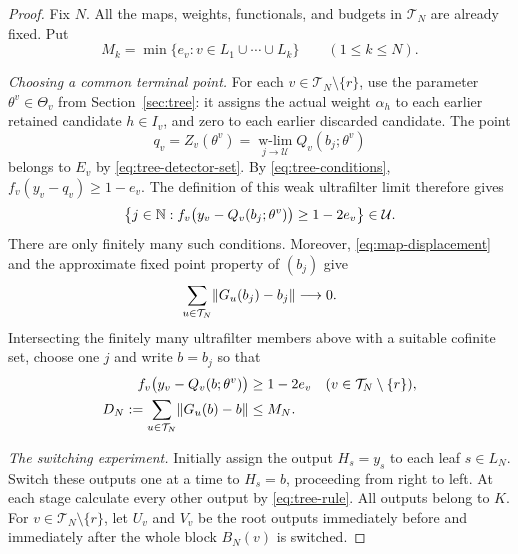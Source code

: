 \begin{proof}
Fix $N$. All the maps, weights, functionals, and budgets in $\mathcal T_N$
are already fixed. Put
\[
  M_k=\min\{e_v:v\in L_1\cup\cdots\cup L_k\}
  \qquad(1\leq k\leq N).
\]

\emph{Choosing a common terminal point.}
For each $v\in\mathcal T_N\setminus\{r\}$, use the parameter
$\theta^v\in\Theta_v$ from Section~\ref{sec:tree}: it assigns the actual
weight $\alpha_h$ to each earlier retained candidate $h\in I_v$, and zero
to each earlier discarded candidate. The point
\[
  q_v=Z_v(\theta^v)
      =\operatorname*{w-lim}_{j\to\mathcal U}Q_v(b_j;\theta^v)
\]
belongs to $E_v$ by \eqref{eq:tree-detector-set}. By \eqref{eq:tree-conditions},
$f_v(y_v-q_v)\geq 1-e_v$. The definition of this weak ultrafilter limit
therefore gives
\[
  \bigl\{j\in\mathbb N:
       f_v\bigl(y_v-Q_v(b_j;\theta^v)\bigr)\geq 1-2e_v\bigr\}
       \in\mathcal U.
\]
There are only finitely many such conditions. Moreover,
\eqref{eq:map-displacement} and the approximate fixed point property of
$(b_j)$ give
\[
  \sum_{u\in\mathcal T_N}\lVert G_u(b_j)-b_j\rVert\longrightarrow 0.
\]
Intersecting the finitely many ultrafilter members above with a suitable
cofinite set, choose one $j$ and write $b=b_j$ so that
\begin{align}
  f_v\bigl(y_v-Q_v(b;\theta^v)\bigr)
     &\geq 1-2e_v
     &&(v\in\mathcal T_N\setminus\{r\}),
     \label{eq:terminal-detection}\\
  D_N:=\sum_{u\in\mathcal T_N}\lVert G_u(b)-b\rVert
     &\leq M_N.
     \label{eq:truncation-displacement}
\end{align}

\emph{The switching experiment.}
Initially assign the output $H_s=y_s$ to each leaf $s\in L_N$.
Switch these outputs one at a time to $H_s=b$, proceeding from right to
left. At each stage calculate every other output by
\eqref{eq:tree-rule}. All outputs belong to $K$.
For $v\in\mathcal T_N\setminus\{r\}$, let $U_v$ and $V_v$ be the root
outputs immediately before and immediately after the whole block
$B_N(v)$ is switched.


\end{proof}
